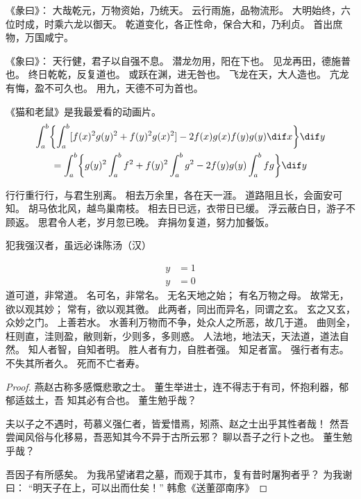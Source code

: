 《彖曰》：
大哉乾元，万物资始，乃统天。
云行雨施，品物流形。
大明始终，六位时成，时乘六龙以御天。
乾道变化，各正性命，保合大和，乃利贞。
首出庶物，万国咸宁。

《象曰》：
天行健，君子以自强不息。
潜龙勿用，阳在下也。
见龙再田，德施普也。
终日乾乾，反复道也。
或跃在渊，进无咎也。
飞龙在天，大人造也。
亢龙有悔，盈不可久也。
用九，天德不可为首也。

\begin{lemma}
  《猫和老鼠》是我最爱看的动画片。
  \begin{multline*}%
    \int_a^b\biggl\{\int_a^b[f(x)^2g(y)^2+f(y)^2g(x)^2]
    -2f(x)g(x)f(y)g(y)\dif x\biggr\}\dif y \\
    =\int_a^b\biggl\{g(y)^2\int_a^bf^2+f(y)^2
    \int_a^b g^2-2f(y)g(y)\int_a^b fg\biggr\}\dif y
  \end{multline*}
\end{lemma}

行行重行行，与君生别离。
相去万余里，各在天一涯。
道路阻且长，会面安可知。
胡马依北风，越鸟巢南枝。
相去日已远，衣带日已缓。
浮云蔽白日，游子不顾返。
思君令人老，岁月忽已晚。
弃捐勿复道，努力加餐饭。

\begin{theorem}\label{the:theorem1}
  犯我强汉者，虽远必诛\hfill \pozhehao 陈汤（汉）
\end{theorem}
\begin{subequations}
  \begin{align}
    y & = 1 \\
    y & = 0
  \end{align}
\end{subequations}
道可道，非常道。
名可名，非常名。
无名天地之始；
有名万物之母。
故常无，欲以观其妙；
常有，欲以观其徼。
此两者，同出而异名，同谓之玄。
玄之又玄，众妙之门。
上善若水。
水善利万物而不争，处众人之所恶，故几于道。
曲则全，枉则直，洼则盈，敝则新，少则多，多则惑。
人法地，地法天，天法道，道法自然。
知人者智，自知者明。
胜人者有力，自胜者强。
知足者富。
强行者有志。
不失其所者久。
死而不亡者寿。

\begin{proof}
  燕赵古称多感慨悲歌之士。
  董生举进士，连不得志于有司，怀抱利器，郁郁适兹土，吾  知其必有合也。
  董生勉乎哉？

  夫以子之不遇时，苟慕义强仁者，皆爱惜焉，矧燕、赵之士出乎其性者哉！
  然吾尝闻风俗与化移易，吾恶知其今不异于古所云邪？
  聊以吾子之行卜之也。
  董生勉乎哉？

  吾因子有所感矣。
  为我吊望诸君之墓，而观于其市，复有昔时屠狗者乎？
  为我谢曰：
  “明天子在上，可以出而仕矣！”
  \hfill\pozhehao 韩愈《送董邵南序》
\end{proof}


